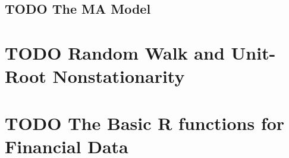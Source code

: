 \documentclass[a4paper,11pt]{article}
\begin{document}
\subsection{{\bfseries\sffamily TODO} The MA Model}
\label{sec:org8f7c15f}



\section{{\bfseries\sffamily TODO} Random Walk and Unit-Root Nonstationarity}
\label{sec:orgb7ed07b}



\section{{\bfseries\sffamily TODO} The Basic R functions for Financial Data}
\label{sec:orgb75e331}
\end{document}
